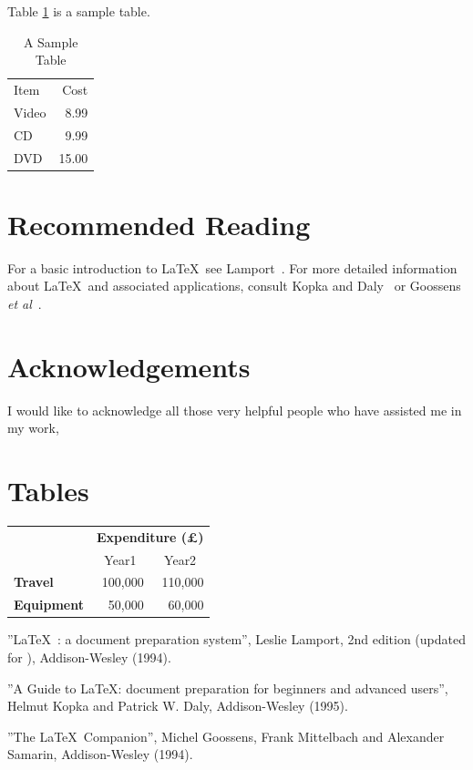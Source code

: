 \documentclass[12pt]{scrbook}
\begin{document}
Table \ref{tab:sample_table} is a sample table.
\begin{table}[htbp]
    \caption{A Sample Table}
    \label{tab:sample_table}
    \centering
    \begin{tabular}{lr}
        Item  & Cost \\
        Video & 8.99 \\
        CD    & 9.99 \\
        DVD   & 15.00 \\
    \end{tabular}
\end{table}

\chapter{Recommended Reading}
For a basic introduction to \LaTeX\ see Lamport~\cite{lamport94}. For more
detailed information about \LaTeX\ and associated applications, consult
Kopka and Daly~\cite{kopka95} or Goossens \emph{et al}~\cite{goossens94}.

\chapter*{Acknowledgements}

I would like to acknowledge all those
very helpful people who have assisted me in my work,

\appendix

\chapter{Tables}

\begin{tabular}{lrr}
                     & \multicolumn{2}{c}{\bfseries Expenditure (\pounds)} \\
                     & \multicolumn{1}{c}{Year1} & \multicolumn{1}{c}{Year2} \\
 \bfseries Travel    & 100,000 & 110,000 \\
 \bfseries Equipment & 50,000  & 60,000
\end{tabular}

\begin{thebibliography}{Goossens 1994}
     ''\LaTeX\ : a document preparation system'',
    Leslie Lamport, 2nd edition (updated for \LaTeXe), Addison-Wesley (1994).

     ''A Guide to \LaTeX: document preparation for
    beginners and advanced users'', Helmut Kopka and Patrick W. Daly, 
    Addison-Wesley (1995).

     ''The \LaTeX\ Companion'', Michel Goossens,
    Frank Mittelbach and Alexander Samarin, Addison-Wesley (1994).
\end{thebibliography}
\end{document}

